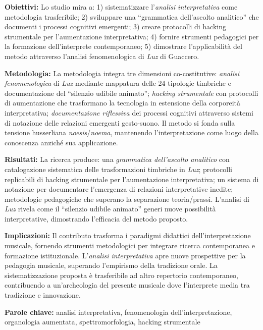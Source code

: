 \documentclass[12pt,a4paper]{article}
\begin{document}
\textbf{Obiettivi:} Lo studio mira a: 1) sistematizzare l'\textit{analisi interpretativa} come metodologia trasferibile; 2) sviluppare una ``grammatica dell'ascolto analitico'' che documenti i processi cognitivi emergenti; 3) creare protocolli di hacking strumentale per l'aumentazione interpretativa; 4) fornire strumenti pedagogici per la formazione dell'interprete contemporaneo; 5) dimostrare l'applicabilità del metodo attraverso l'analisi fenomenologica di \textit{Luz} di Guaccero.

\textbf{Metodologia:} La metodologia integra tre dimensioni co-costitutive: \textit{analisi fenomenologica} di \textit{Luz} mediante mappatura delle 24 tipologie timbriche e documentazione del ``silenzio udibile animato''; \textit{hacking strumentale} con protocolli di aumentazione che trasformano la tecnologia in estensione della corporeità interpretativa; \textit{documentazione riflessiva} dei processi cognitivi attraverso sistemi di notazione delle relazioni emergenti gesto-suono. Il metodo si fonda sulla tensione husserliana \textit{noesis}/\textit{noema}, mantenendo l'interpretazione come luogo della conoscenza anziché sua applicazione.

\textbf{Risultati:} La ricerca produce: una \textit{grammatica dell'ascolto analitico} con catalogazione sistematica delle trasformazioni timbriche in \textit{Luz}; protocolli replicabili di hacking strumentale per l'aumentazione interpretativa; un sistema di notazione per documentare l'emergenza di relazioni interpretative inedite; metodologie pedagogiche che superano la separazione teoria/prassi. L'analisi di \textit{Luz} rivela come il ``silenzio udibile animato'' generi nuove possibilità interpretative, dimostrando l'efficacia del metodo proposto.

\textbf{Implicazioni:} Il contributo trasforma i paradigmi didattici dell'interpretazione musicale, fornendo strumenti metodologici per integrare ricerca contemporanea e formazione istituzionale. L'\textit{analisi interpretativa} apre nuove prospettive per la pedagogia musicale, superando l'empirismo della tradizione orale. La sistematizzazione proposta è trasferibile ad altro repertorio contemporaneo, contribuendo a un'archeologia del presente musicale dove l'interprete media tra tradizione e innovazione.

\vspace{1cm}

\textbf{Parole chiave:} analisi interpretativa, fenomenologia dell'interpretazione, organologia aumentata, spettromorfologia, hacking strumentale
\end{document}
